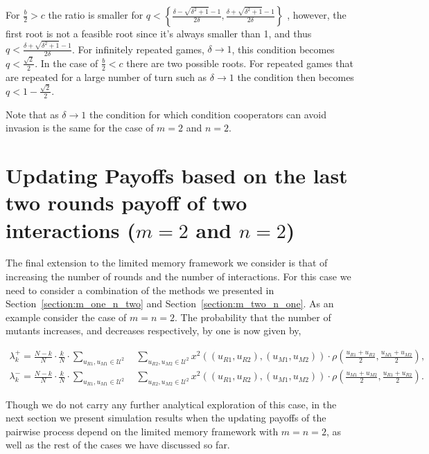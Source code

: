 \documentclass[11pt]{article}
\theoremstyle{plainCl1}
\theoremstyle{plainCl2}
\begin{document}
For \(\frac{b}{2}>c\) the ratio is smaller for
\(q < \left\{\frac{\delta - \sqrt{\delta^{2} + 1} - 1}{2 \delta}, \frac{\delta + \sqrt{\delta^{2} + 1} - 1}{2 \delta}\right\}\)
, however, the first root is not a feasible root since it's always smaller
than 1, and thus \(q < \frac{\delta + \sqrt{\delta^{2} + 1} - 1}{2 \delta}\). For
infinitely repeated games, \(\delta \rightarrow 1\), this condition becomes \(q
< \frac{\sqrt{2}}{2}\). In the case of \(\frac{b}{2}<c\) there are two possible
roots. For repeated games that are repeated for a large number of turn such as
\(\delta \rightarrow 1\) the condition then becomes \(q < 1 -
\frac{\sqrt{2}}{2}\).

Note that as \(\delta \rightarrow 1\) the condition for which condition
cooperators can avoid invasion is the same for the case of \(m=2\) and \(n=2\).

\section{Updating Payoffs based on the last two rounds payoff of two interactions (\(m=2\) and \(n=2\))}\label{section:m_two_n_two}

The final extension to the limited memory framework we consider is that of
increasing the number of rounds and the number of interactions. For this case we
need to consider a combination of the methods we presented in
Section~\ref{section:m_one_n_two} and Section~\ref{section:m_two_n_one}. As an
example consider the case of \(m=n=2\). The probability that the number of
mutants increases, and decreases respectively, by one is now given by,

\begin{align}
  \lambda^+_k=\frac{N\!-\!k}{N}\cdot \frac{k}{N}\cdot \sum_{u_{R1},u_{M1}\in\mathcal{U}^{2}} \quad \sum_{u_{R2},u_{M2}\in\mathcal{U}^{2}} x^{2}((u_{R1}, u_{R2}),(u_{M1}, u_{M2}))\cdot \rho\left(\frac{u_{R1} + u_{R2}}{2}, \frac{u_{M1} + u_{M2}}{2}\right), \\
  \lambda^-_k=\frac{N\!-\!k}{N}\cdot \frac{k}{N}\cdot \sum_{u_{R1},u_{M1}\in\mathcal{U}^{2}} \quad \sum_{u_{R2},u_{M2}\in\mathcal{U}^{2}} x^{2}((u_{R1}, u_{R2}),(u_{M1}, u_{M2}))\cdot \rho\left(\frac{u_{M1} + u_{M2}}{2}, \frac{u_{R1} + u_{R2}}{2}\right).
\end{align}

Though we do not carry any further analytical exploration of this case, in the
next section we present simulation results when the updating payoffs of the
pairwise process depend on the limited memory framework with \(m=n=2\), as well
as the rest of the cases we have discussed so far.
\end{document}

